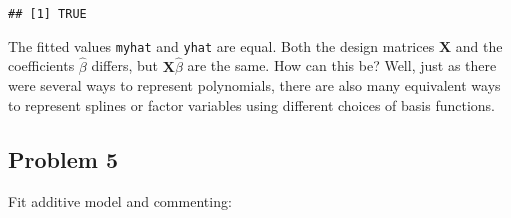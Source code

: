 \documentclass[
]{article}
\newenvironment{Shaded}{\begin{snugshade}}{\end{snugshade}}
\newcommand{\AttributeTok}[1]{\textcolor[rgb]{0.13,0.29,0.53}{#1}}
\newcommand{\CommentTok}[1]{\textcolor[rgb]{0.56,0.35,0.01}{\textit{#1}}}
\newcommand{\ConstantTok}[1]{\textcolor[rgb]{0.56,0.35,0.01}{#1}}
\newcommand{\DecValTok}[1]{\textcolor[rgb]{0.00,0.00,0.81}{#1}}
\newcommand{\FunctionTok}[1]{\textcolor[rgb]{0.13,0.29,0.53}{\textbf{#1}}}
\newcommand{\NormalTok}[1]{#1}
\newcommand{\OtherTok}[1]{\textcolor[rgb]{0.56,0.35,0.01}{#1}}
\newcommand{\SpecialCharTok}[1]{\textcolor[rgb]{0.81,0.36,0.00}{\textbf{#1}}}
\newcommand{\StringTok}[1]{\textcolor[rgb]{0.31,0.60,0.02}{#1}}
\begin{document}
\begin{verbatim}
## [1] TRUE
\end{verbatim}

The fitted values \texttt{myhat} and \texttt{yhat} are equal. Both the
design matrices \(\mathbf X\) and the coefficients \(\hat{\beta}\)
differs, but \(\mathbf X \hat{\beta}\) are the same. How can this be?
Well, just as there were several ways to represent polynomials, there
are also many equivalent ways to represent splines or factor variables
using different choices of basis functions.

\hypertarget{problem-5}{%
\subsection{Problem 5}\label{problem-5}}

Fit additive model and commenting:

\begin{Shaded}
\end{Shaded}
\end{document}
